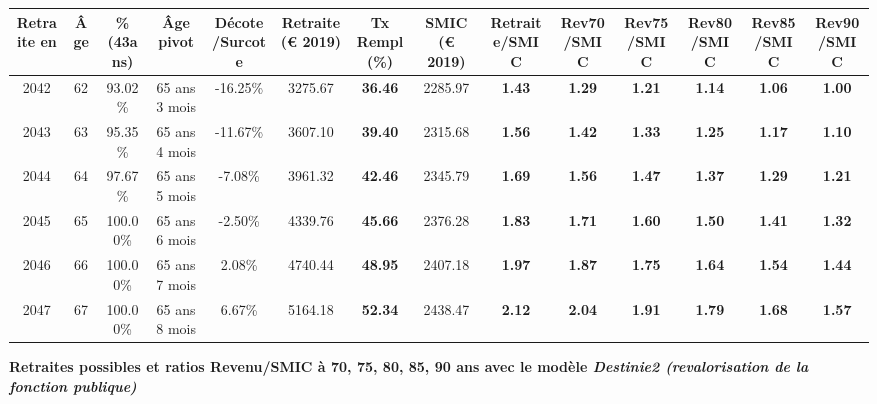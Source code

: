 \begin{adjustbox}{max width=\textwidth} 
\begin{tabular}[htb]{|c|c||c|c|c||c|c||c||c|c|c|c|c|c|} 
\hline 
 Retraite en &  Âge &  \%(43ans) &  Âge pivot &  Décote/Surcote &  Retraite (\euro{} 2019) &  Tx Rempl(\%) &  SMIC (\euro{} 2019) &  Retraite/SMIC &  Rev70/SMIC &  Rev75/SMIC &  Rev80/SMIC &  Rev85/SMIC &  Rev90/SMIC \\ 
\hline \hline 
 2042 &  62 &  93.02\% &  65 ans 3 mois &  -16.25\% &  3275.67 &  {\bf 36.46} &  2285.97 &  {\bf 1.43} &  {\bf 1.29} &  {\bf 1.21} &  {\bf 1.14} &  {\bf 1.06} &  {\bf {\color{red} 1.00}} \\ 
\hline 
 2043 &  63 &  95.35\% &  65 ans 4 mois &  -11.67\% &  3607.10 &  {\bf 39.40} &  2315.68 &  {\bf 1.56} &  {\bf 1.42} &  {\bf 1.33} &  {\bf 1.25} &  {\bf 1.17} &  {\bf 1.10} \\ 
\hline 
 2044 &  64 &  97.67\% &  65 ans 5 mois &  -7.08\% &  3961.32 &  {\bf 42.46} &  2345.79 &  {\bf 1.69} &  {\bf 1.56} &  {\bf 1.47} &  {\bf 1.37} &  {\bf 1.29} &  {\bf 1.21} \\ 
\hline 
 2045 &  65 &  100.00\% &  65 ans 6 mois &  -2.50\% &  4339.76 &  {\bf 45.66} &  2376.28 &  {\bf 1.83} &  {\bf 1.71} &  {\bf 1.60} &  {\bf 1.50} &  {\bf 1.41} &  {\bf 1.32} \\ 
\hline 
 2046 &  66 &  100.00\% &  65 ans 7 mois &  2.08\% &  4740.44 &  {\bf 48.95} &  2407.18 &  {\bf 1.97} &  {\bf 1.87} &  {\bf 1.75} &  {\bf 1.64} &  {\bf 1.54} &  {\bf 1.44} \\ 
\hline 
 2047 &  67 &  100.00\% &  65 ans 8 mois &  6.67\% &  5164.18 &  {\bf 52.34} &  2438.47 &  {\bf 2.12} &  {\bf 2.04} &  {\bf 1.91} &  {\bf 1.79} &  {\bf 1.68} &  {\bf 1.57} \\ 
\hline 
\hline 
\end{tabular} 
\end{adjustbox} 
 
 \vspace{0.1cm} 
{\bf \noindent Retraites possibles et ratios Revenu/SMIC à 70, 75, 80, 85, 90 ans avec le modèle \emph{Destinie2 (revalorisation de la fonction publique)}}  
 
